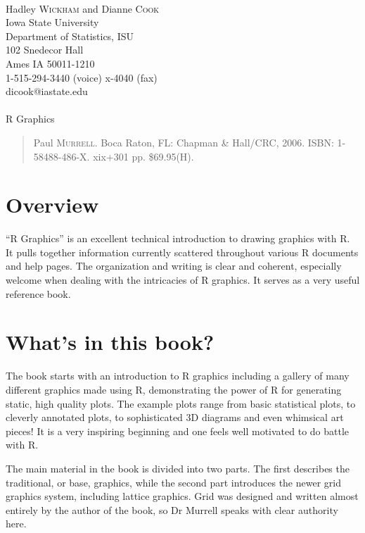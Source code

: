 \documentclass[12pt]{article}
\begin{document}
\noindent [Reviewer]\\ 
Hadley \textsc{Wickham} and Dianne \textsc{Cook} \\ 
Iowa State University \\ 
Department of Statistics, ISU \\ 
102 Snedecor Hall \\ 
Ames IA 50011-1210 \\ 
1-515-294-3440 (voice) x-4040 (fax) \\ 
dicook@iastate.edu \\ 


\noindent [Book \#6090]\\ 
{\Large\sf R Graphics}
\begin{quotation}\noindent
 Paul \textsc{Murrell}.  
Boca Raton, FL: Chapman \& Hall/CRC, 2006.  ISBN: 1-58488-486-X. xix+301 pp. \$69.95(H).  
\end{quotation}\vspace{12pt}

\setlength{\baselineskip}{20pt}

\section{Overview}

``R Graphics'' is an excellent technical introduction to drawing
graphics with R. It pulls together information currently scattered
throughout various R documents and help pages. The organization and
writing is clear and coherent, especially welcome when dealing with
the intricacies of R graphics.  It serves as a very useful reference
book.

\section{What's in this book?}

The book starts with an introduction to R graphics including a gallery
of many different graphics made using R, demonstrating the power of R
for generating static, high quality plots. The example plots range
from basic statistical plots, to cleverly annotated plots, to
sophisticated 3D diagrams and even whimsical art pieces! It is a very
inspiring beginning and one feels well motivated to do battle with R.

The main material in the book is divided into two parts.  The first
describes the traditional, or base, graphics, while the second part
introduces the newer grid graphics system, including lattice graphics.
Grid was designed and written almost entirely by the author of the
book, so Dr Murrell speaks with clear authority here.
\end{document}
